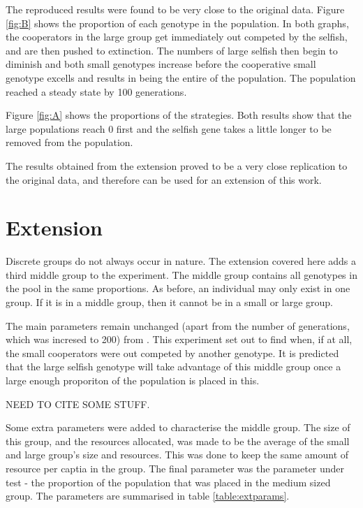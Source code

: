 \documentclass[11pt]{ecsarticle}
\begin{document}
The reproduced results were found to be very close to the original data. 
Figure \ref{fig:B} shows the proportion of each genotype in the population.
In both graphs, the cooperators in the large group get immediately out competed by the selfish, and are then pushed to extinction.
The numbers of large selfish then begin to diminish and both small genotypes increase before the cooperative small genotype excells and results in being the entire of the population.
The population reached a steady state by 100 generations.

Figure \ref{fig:A} shows the proportions of the strategies. 
Both results show that the large populations reach 0 first and the selfish gene takes a little longer to be removed from the population.

The results obtained from the extension proved to be a very close replication to the original data, and therefore can be used for an extension of this work.

\section{Extension}\label{sc:extension}

Discrete groups do not always occur in nature.
The extension covered here adds a third middle group to the experiment. 
The middle group contains all genotypes in the pool in the same proportions.
As before, an individual may only exist in one group. 
If it is in a middle group, then it cannot be in a small or large group.

The main parameters remain unchanged (apart from the number of generations, which was incresed to 200) from \cite{powers2007individual}.
This experiment set out to find when, if at all, the small cooperators were out competed by another genotype.
It is predicted that the large selfish genotype will take advantage of this middle group once a large enough proporiton of the population is placed in this.

NEED TO CITE SOME STUFF.




Some extra parameters were added to characterise the middle group. 
The size of this group, and the resources allocated, was made to be the average of the small and large group's size and resources. 
This was done to keep the same amount of resource per captia in the group.
The final parameter was the parameter under test - the proportion of the population that was placed in the medium sized group.
The parameters are summarised in table \ref{table:extparams}. 
\end{document}
